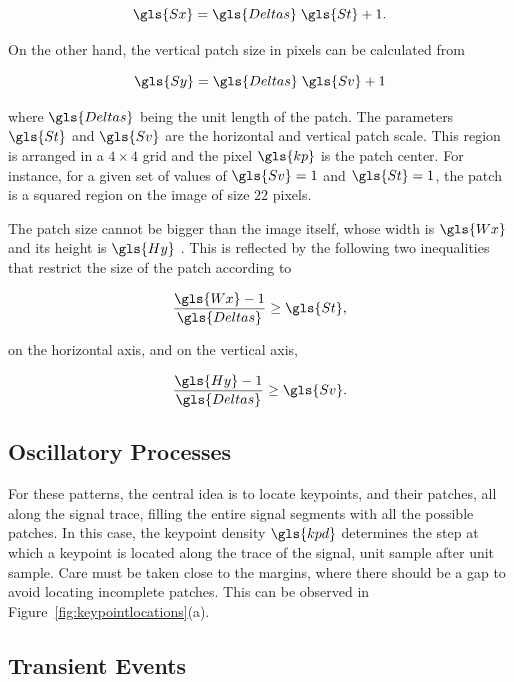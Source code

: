\begin{equation}
\gls{Sx} = \gls{Deltas} \; \gls{St} + 1.
\label{eq:sx}
\end{equation}

On the other hand, the vertical patch size in pixels can be calculated from

\begin{equation}
\gls{Sy} = \gls{Deltas} \; \gls{Sv} + 1
\label{eq:sy}
\end{equation}

\noindent where $\gls{Deltas}$ being the unit length of the patch. The parameters $\gls{St}$  and $\gls{Sv}$ are the horizontal and vertical patch scale. This region is arranged in a $4 \times 4$ grid and the pixel $\gls{kp}$ is the patch center.   For instance, for a given set of values of $\gls{Sv} = 1$ and $\gls{St} = 1$, the patch is a squared region on the image of size $22$ pixels.

The patch size cannot be bigger than the image itself, whose width is $\gls{Wx}$ and its height is $\gls{Hy}$ .  This is reflected by the following two inequalities that restrict the size of the patch according to 

\begin{equation}
\frac{\gls{Wx}-1}{\gls{Deltas}}  \geq \gls{St} ,
\label{eq:restriction1}
\end{equation}

\noindent on the horizontal axis, and on the vertical axis, 

\begin{equation}
\frac{\gls{Hy}-1}{\gls{Deltas}}  \geq \gls{Sv}.
\label{eq:restriction2}
\end{equation}

\subsection{Oscillatory Processes}

For these patterns, the central idea is to locate keypoints, and their patches, all along the signal trace, filling the entire signal segments with all the possible patches.  In this case, the keypoint density $\gls{kpd} $ determines the step at which a keypoint is located along the trace of the signal, unit sample after unit sample. Care must be taken close to the margins, where there should be a gap to avoid locating incomplete patches.  This can be observed in Figure~\ref{fig:keypointlocations}(a).

\subsection{Transient Events}

